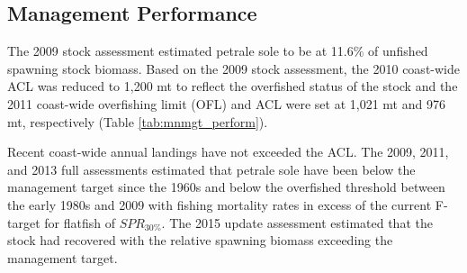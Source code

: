 \documentclass[12pt,]{article}
\begin{document}
\FloatBarrier

\subsection*{Management Performance}\label{management-performance}

The 2009 stock assessment estimated petrale sole to be at 11.6\% of
unfished spawning stock biomass. Based on the 2009 stock assessment, the
2010 coast-wide ACL was reduced to 1,200 mt to reflect the overfished
status of the stock and the 2011 coast-wide overfishing limit (OFL) and
ACL were set at 1,021 mt and 976 mt, respectively (Table
\ref{tab:mnmgt_perform}).

Recent coast-wide annual landings have not exceeded the ACL. The 2009,
2011, and 2013 full assessments estimated that petrale sole have been
below the management target since the 1960s and below the overfished
threshold between the early 1980s and 2009 with fishing mortality rates
in excess of the current F-target for flatfish of \(SPR_{30\%}\). The
2015 update assessment estimated that the stock had recovered with the
relative spawning biomass exceeding the management target.

\begin{table}[ht]
\centering
\caption{Recent trend in total catch and landings (mt) relative to the management guidelines. 
                              Estimated total catch reflect the landings plus the model estimated discards based on discard rate data.
                              The catch values shown here may have minimal differences from the West Coast Groundfish Total Mortality Estimates.} 
\label{tab:mnmgt_perform}
\end{table}
\end{document}
